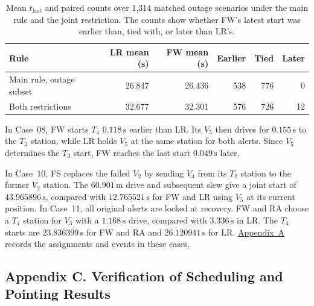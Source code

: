 \documentclass{swmcmthesis}
\begin{document}
\begin{table}[!htbp]
    \centering
    \caption{Mean \(t_{\mathrm{last}}\) and paired counts over 1,314 matched outage scenarios under the main rule and the joint restriction. The counts show whether FW's latest start was earlier than, tied with, or later than LR's.}
    \label{tab:q4-matched-outage}
    \begin{tabular}{@{}lrrrrr@{}}
        \toprule
        Rule & LR mean (s) & FW mean (s) & Earlier & Tied & Later \\
        \midrule
        Main rule, outage subset & 26.847 & 26.436 & 538 & 776 & 0 \\
        Both restrictions & 32.677 & 32.301 & 576 & 726 & 12 \\
        \bottomrule
    \end{tabular}
\end{table}

In Case~08, FW starts \(T_4\) \(0.118\,\mathrm s\) earlier than LR. Its \(V_5\) then drives for \(0.155\,\mathrm s\) to the \(T_3\) station, while LR holds \(V_5\) at the same station for both alerts. Since \(V_5\) determines the \(T_3\) start, FW reaches the last start \(0.049\,\mathrm s\) later.

In Case~10, FS replaces the failed \(V_2\) by sending \(V_4\) from its \(T_2\) station to the former \(V_2\) station. The \(60.901\,\mathrm m\) drive and subsequent slew give a joint start of \(43.965896\,\mathrm s\), compared with \(12.765521\,\mathrm s\) for FW and LR using \(V_5\) at its current position. In Case~11, all original alerts are locked at recovery. FW and RA choose a \(T_4\) station for \(V_3\) with a \(1.168\,\mathrm s\) drive, compared with \(3.336\,\mathrm s\) in LR. The \(T_4\) starts are \(23.836399\,\mathrm s\) for FW and RA and \(26.120941\,\mathrm s\) for LR. \hyperref[app:q4]{Appendix~A} records the assignments and events in these cases.

\clearpage
\subsection*{Appendix C. Verification of Scheduling and Pointing Results}
\label{app:verification}
\end{document}
